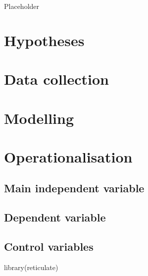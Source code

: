 \documentclass[a4paper, oneside]{report}
\newenvironment{Shaded}{\begin{snugshade}}{\end{snugshade}}
\newcommand{\FunctionTok}[1]{\textcolor[rgb]{0.00,0.00,0.00}{#1}}
\newcommand{\NormalTok}[1]{#1}
\renewenvironment{Shaded}
{
  \vspace{4pt}%
  \begin{snugshade}%
}{%
  \end{snugshade}%
  \vspace{4pt}%
}
\begin{document}
Placeholder

\hypertarget{hypotheses}{%
\section{Hypotheses}\label{hypotheses}}

\hypertarget{data-collection}{%
\section{Data collection}\label{data-collection}}

\hypertarget{modelling}{%
\section{Modelling}\label{modelling}}

\hypertarget{operationalisation}{%
\section{Operationalisation}\label{operationalisation}}

\hypertarget{main-independent-variable}{%
\subsection{Main independent variable}\label{main-independent-variable}}

\hypertarget{dependent-variable}{%
\subsection{Dependent variable}\label{dependent-variable}}

\hypertarget{control-variables}{%
\subsection{Control variables}\label{control-variables}}

\setcounter{chapter}{3}

\begin{Shaded}
\begin{Highlighting}[]
\FunctionTok{library}\NormalTok{(reticulate)}
\end{Highlighting}
\end{Shaded}
\end{document}
